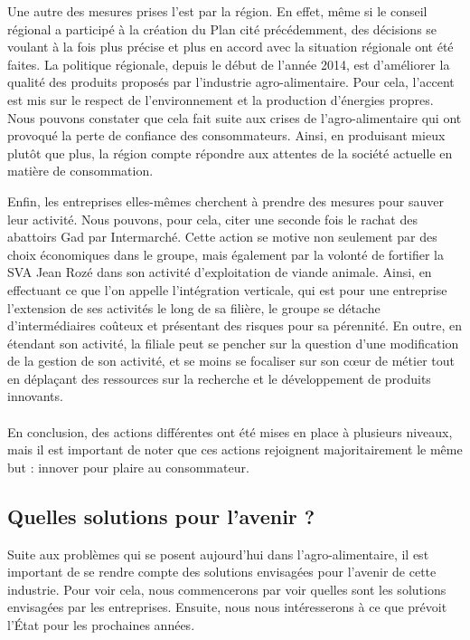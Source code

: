\documentclass[a4paper,12pt]{report}
\begin{document}
			Une autre des mesures prises l’est par la région. En effet, même si le conseil régional a participé à la création du Plan cité précédemment, des décisions se voulant à la fois plus précise et plus en accord avec la situation régionale ont été faites. La politique régionale, depuis le début de l’année 2014, est d’améliorer la qualité des produits proposés par l’industrie agro-alimentaire\cite{FavoriserQualiteAgricultureAgroalimentaire}. Pour cela, l’accent est mis sur le respect de l’environnement et la production d’énergies propres. Nous pouvons constater que cela fait suite aux crises de l’agro-alimentaire qui ont provoqué la perte de confiance des consommateurs. Ainsi, en produisant mieux plutôt que plus, la région compte répondre aux attentes de la société actuelle en matière de consommation.

			Enfin, les entreprises elles-mêmes cherchent à prendre des mesures pour sauver leur activité. Nous pouvons, pour cela, citer une seconde fois le rachat des abattoirs Gad par Intermarché. Cette action se motive non seulement par des choix économiques dans le groupe, mais également par la volonté de fortifier la SVA Jean Rozé dans son activité d’exploitation de viande animale. Ainsi, en effectuant ce que l’on appelle l’intégration verticale, qui est pour une entreprise l’extension de ses activités le long de sa filière, le groupe se détache d’intermédiaires coûteux et présentant des risques pour sa pérennité. En outre, en étendant son activité, la filiale peut se pencher sur la question d’une modification de la gestion de son activité, et se moins se focaliser sur son cœur de métier tout en déplaçant des ressources sur la recherche et le développement de produits innovants.

			\paragraph{}En conclusion, des actions différentes ont été mises en place à plusieurs niveaux, mais il est important de noter que ces actions rejoignent majoritairement le même but : innover pour plaire au consommateur.

			
		\subsection{Quelles solutions pour l'avenir ?}
			Suite aux problèmes qui se posent aujourd'hui dans l’agro-alimentaire, il est important de se rendre compte des solutions envisagées pour l’avenir de cette industrie. Pour voir cela, nous commencerons par voir quelles sont les solutions envisagées par les entreprises. Ensuite, nous nous intéresserons à ce que prévoit l’État pour les prochaines années.
			
\end{document}

